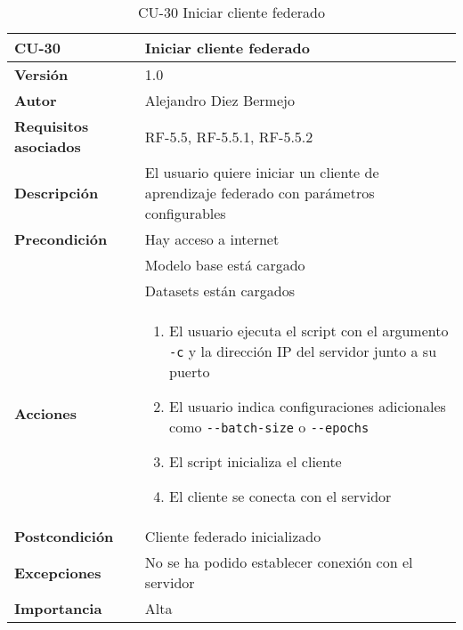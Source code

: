 \begin{table}[p]
	\centering
	\begin{tabularx}{\linewidth}{ p{} p{} }
		\toprule
		\textbf{CU-30}    & \textbf{Iniciar cliente federado}\\
		\toprule
		\textbf{Versión}              & 1.0    \\
		\textbf{Autor}                & Alejandro Diez Bermejo \\
		\textbf{Requisitos asociados} & RF-5.5, RF-5.5.1, RF-5.5.2 \\
		\textbf{Descripción}          & El usuario quiere iniciar un cliente de aprendizaje federado con parámetros configurables \\
        \textbf{Precondición}         & Hay acceso a internet \\
                                      & Modelo base está cargado \\
                                      & Datasets están cargados \\
		\textbf{Acciones}             &
		\begin{enumerate}
			\def\labelenumi{\arabic{enumi}.}
			\tightlist
            \item El usuario ejecuta el script con el argumento \texttt{-c} y la dirección IP del servidor junto a su puerto
            \item El usuario indica configuraciones adicionales como \texttt{-{}-batch-size} o \texttt{-{}-epochs}
            \item El script inicializa el cliente
            \item El cliente se conecta con el servidor
		\end{enumerate}\\
		\textbf{Postcondición}        & Cliente federado inicializado \\
		\textbf{Excepciones}          & No se ha podido establecer conexión con el servidor\\
		\textbf{Importancia}          & Alta \\
		\bottomrule
	\end{tabularx}
	\caption{CU-30 Iniciar cliente federado}
\end{table}

